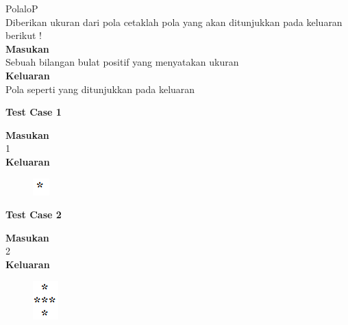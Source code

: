 \newpage
\begin{permasalahan}{PolaloP}\\
\label{prob:PembilangPerPenyebut}
	Diberikan ukuran dari pola cetaklah pola yang akan ditunjukkan pada keluaran berikut ! \\
	\textbf{Masukan}\\
	Sebuah bilangan bulat positif yang menyatakan ukuran\\
	\textbf{Keluaran}\\
	Pola seperti yang ditunjukkan pada keluaran\\
	\begin{center}
	\textbf{Test Case 1}\\
	\end{center}
	\textbf{Masukan}\\
	1\\
	\textbf{Keluaran}\\
		\begin{figure}[h!]
		\includegraphics{fig/Bintang/1.png}	
		\end{figure}

	\begin{center}
	\textbf{Test Case 2}\\
	\end{center}
	\textbf{Masukan}\\
	2\\
	\textbf{Keluaran}
		\begin{figure}[h!]
		\includegraphics{fig/Bintang/2.png}	
		\end{figure}


\end{permasalahan}
